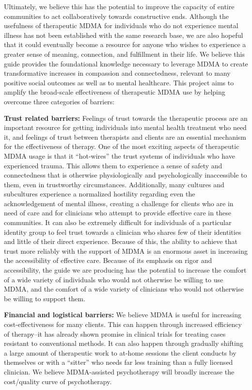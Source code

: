 \documentclass[12pt,letterpaper]{article}
\begin{document}
Ultimately, we believe this has the potential to improve the capacity of entire communities to act collaboratively towards constructive ends. Although the usefulness of therapeutic MDMA for individuals who do not experience mental illness has not been established with the same research base, we are also hopeful that it could eventually become a resource for anyone who wishes to experience a greater sense of meaning, connection, and fulfillment in their life. We believe this guide provides the foundational knowledge necessary to leverage MDMA to create transformative increases in compassion and connectedness, relevant to many positive social outcomes as well as to mental healthcare. This project aims to amplify the broad-scale effectiveness of therapeutic MDMA use by helping overcome three categories of barriers:

\textbf{Trust related barriers:} Feelings of trust towards the therapeutic process are an important resource for getting individuals into mental health treatment who need it, and feelings of trust between therapists and clients are an essential mechanism for the effectiveness of therapy. One of the most exciting aspects of therapeutic MDMA usage is that it “hot-wires” the trust systems of individuals who have experienced trauma. This allows them to experience a sense of safety and connectedness that is otherwise physiologically and psychologically inaccessible to them, even in trustworthy circumstances. Additionally, many cultures and subcultures experience a normalized hostility regarding even the acknowledgement of mental illness, creating a challenge for clients who are in need of care and for clinicians who attempt to provide effective care in these communities. It can also be extremely difficult for individuals of a particular identity group to feel trust towards a clinician who shares few of their identities and little of their direct experience. Because of this, the ability to achieve that trust more reliably with the support of MDMA is an enormous asset in increasing the accessibility of effective care. Because of its emphasis on rigor and accessibility, the guide we are producing has the potential to increase the comfort of a wide variety of individuals who would not otherwise be willing to use MDMA, and the comfort of a wide variety of clinicians who would not otherwise be willing to support them. 

\textbf{Financial and logistical barriers:} We believe MDMA is useful for increasing cost-effectiveness for many clients. This can happen through increased efficiency of therapy–it has already shown promise in clinical trials for treating cases resistant to conventional methods. It can also happen  through gradually shifting a large amount of therapeutic work to at-home sessions the client conducts by themselves or with a “sitter” who needs far less training than a fully licensed clinician. We believe MDMA-assisted psychotherapy will broadly increase the cost/quality curve of psychotherapy.
\end{document}
